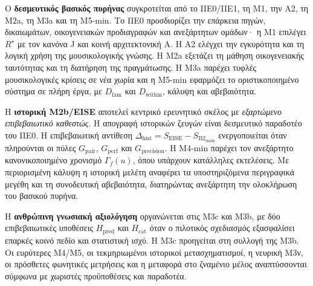 \documentclass[11pt,a4paper]{article}
\begin{document}
Ο \textbf{δεσμευτικός βασικός πυρήνας} συγκροτείται από το ΠΕ0/ΠΕ1, τη Μ1, την Α2, τη Μ2a, τη Μ3a και τη Μ5-min. Το ΠΕ0 προσδιορίζει την επάρκεια πηγών, δικαιωμάτων, οικογενειακών προδιαγραφών και ανεξάρτητων ομάδων· η Μ1 επιλέγει $R^\star$ με τον κανόνα J και κοινή αρχιτεκτονική A. Η Α2 ελέγχει την εγκυρότητα και τη λογική χρήση της μουσικολογικής γνώσης. Η Μ2a εξετάζει τη μάθηση οικογενειακής ταυτότητας και τη διατήρηση της πραγμάτωσης. Η Μ3a παρέχει τυφλές μουσικολογικές κρίσεις σε νέα χωρία και η Μ5-min εφαρμόζει το οριστικοποιημένο σύστημα σε πλήρη έργα, με $D_{\mathrm{fam}}$ και $D_{\mathrm{within}}$, κάλυψη και αβεβαιότητα.

Η \textbf{ιστορική Μ2b/EISE} αποτελεί κεντρικό ερευνητικό σκέλος με \emph{εξαρτώμενο επιβεβαιωτικό καθεστώς}. Η απογραφή ιστορικών ζευγών είναι δεσμευτικό παραδοτέο του ΠΕ0. Η επιβεβαιωτική αντίθεση $\Delta_{\mathrm{hist}}=S_{\mathrm{EISE}}-S_{\mathrm{B2}_{\mathrm{main}}}$ ενεργοποιείται όταν πληρούνται οι πύλες $G_{\mathrm{pair}}$, $G_{\mathrm{perf}}$ και $G_{\mathrm{precision}}$. Η Μ4-min παρέχει τον ανεξάρτητο κανονικοποιημένο χρονισμό $\Gamma_f(u)$, όπου υπάρχουν κατάλληλες εκτελέσεις. Με περιορισμένη κάλυψη η ιστορική μελέτη αναφέρει τα υποστηριζόμενα περιγραφικά μεγέθη και τη συνοδευτική αβεβαιότητα, διατηρώντας ανεξάρτητη την ολοκλήρωση του βασικού πυρήνα.

Η \textbf{ανθρώπινη γνωσιακή αξιολόγηση} οργανώνεται στις M3c και M3b, με δύο επιβεβαιωτικές υποθέσεις $H_{\mathrm{pred}}$ και $H_{\mathrm{cat}}$ όταν ο πιλοτικός σχεδιασμός εξασφαλίσει επαρκές κοινό πεδίο και στατιστική ισχύ. Η M3c προηγείται στη συλλογή της M3b. Οι ευρύτερες M4/M5, οι τεκμηριωμένοι ιστορικοί μετασχηματισμοί, η νευρική M3ν, οι πρόσθετες φωνητικές μετρήσεις και η μεταφορά στο ζναμένιο μέλος αναπτύσσονται σύμφωνα με χωριστές προϋποθέσεις και παραδοτέα.
\end{document}
